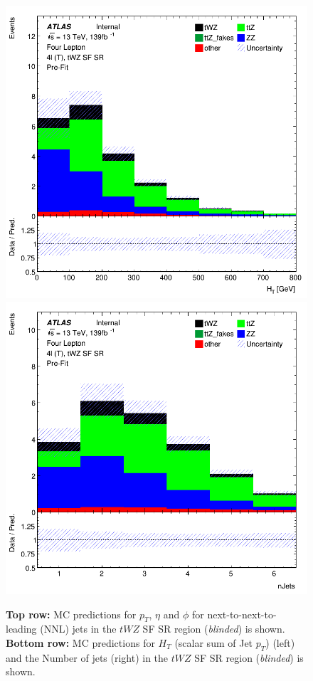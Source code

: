 \begin{figure}[htbp]
    \includegraphics[width=.3\textwidth]{figures/PreFitPlots/lep4_tWZ_4T_SF_HT.png}   \quad
    \includegraphics[width=.3\textwidth]{figures/PreFitPlots/lep4_tWZ_4T_SF_Num_Jets.png}

    \caption{\textbf{Top row:} MC predictions for $p_{T}$, $\eta$ and $\phi$ for next-to-next-to-leading (NNL) jets in the $tWZ$ SF SR region (\textit{blinded}) is shown. \textbf{Bottom row:} MC predictions for $H_{T}$ (scalar sum of Jet $p_{T}$) (left) and the Number of jets (right) in the $tWZ$ SF SR region (\textit{blinded}) is shown.}
    \label{fig:4lep-SF-SR-NNLjetPlots} 
\end{figure}



